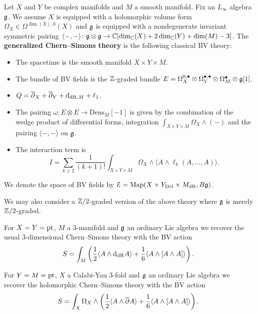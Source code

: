 \documentclass[10pt, oneside]{article}
\newcommand{\Dens}{\mathrm{Dens}}
\begin{document}
\begin{definition}
Let $X$ and $Y$ be complex manifolds and $M$ a smooth manifold. Fix an $L_\infty$ algebra $\mathfrak g$. We assume $X$ is equipped with a holomorphic volume form $\Omega_X \in\Omega^{\dim(X), 0}(X)$ and $\mathfrak g$ is equipped with a nondegenerate invariant symmetric pairing $\langle-, -\rangle\colon \mathfrak g\otimes\mathfrak g\rightarrow \mathbb C[\dim_\mathbb C(X) + 2\dim_\mathbb C(Y) + \dim(M) - 3]$. The {\bf generalized Chern--Simons theory} is the following classical BV theory:
\begin{itemize}
\item The spacetime is the smooth manifold $X\times Y\times M$.

\item The bundle of BV fields is the $\mathbb Z$-graded bundle $E = \Omega^{0,\bullet}_X \otimes \Omega^{\bullet,\bullet}_Y \otimes \Omega^\bullet_M \otimes \mathfrak g[1]$.

\item $Q = \overline{\partial}_X + \overline{\partial}_Y + {\rm d}_{\mathrm{dR}, M} + \ell_1$.

\item The pairing $\omega\colon E\otimes E\rightarrow \Dens_M[-1]$ is given by the combination of the wedge product of differential forms, integration $\int_{X\times Y\times M} \Omega_X\wedge (-)$ and the pairing $\langle -, -\rangle$ on $\mathfrak g$.

\item The interaction term is
\[I = \sum_{k\geq 2}\frac{1}{(k+1)!} \int_{X\times Y\times M} \Omega_X\wedge \langle A\wedge \ell_k(A, \dots, A)\rangle.\]
\end{itemize}
We denote the space of BV fields by $\mathcal E = \operatorname{Map}(X\times Y_{\mathrm{Dol}}\times M_{\mathrm{dR}}, B \mathfrak g)$.
\label{def:generalizedCS}
\end{definition}

We may also consider a $\mathbb Z/2$-graded version of the above theory where $\mathfrak g$ is merely $\mathbb Z/2$-graded.

\begin{example}
For $X=Y=\operatorname{pt}$, $M$ a 3-manifold and $\mathfrak g$ an ordinary Lie algebra we recover the usual 3-dimensional Chern--Simons theory with the BV action
\[S = \int_M \left(\frac{1}{2}\langle A\wedge {\rm d}_{\mathrm{dR}} A\rangle + \frac{1}{6}\langle A\wedge [A\wedge A]\rangle\right).\]
\end{example}

\begin{example}
For $Y=M=\operatorname{pt}$, $X$ a Calabi-Yau 3-fold and $\mathfrak g$ an ordinary Lie algebra we recover the holomorphic Chern--Simons theory with the BV action
\[S = \int_X \Omega_X\wedge \left(\frac{1}{2}\langle A\wedge \overline{\partial} A\rangle + \frac{1}{6}\langle A\wedge [A\wedge A]\rangle\right).\]
\end{example}
\end{document}
